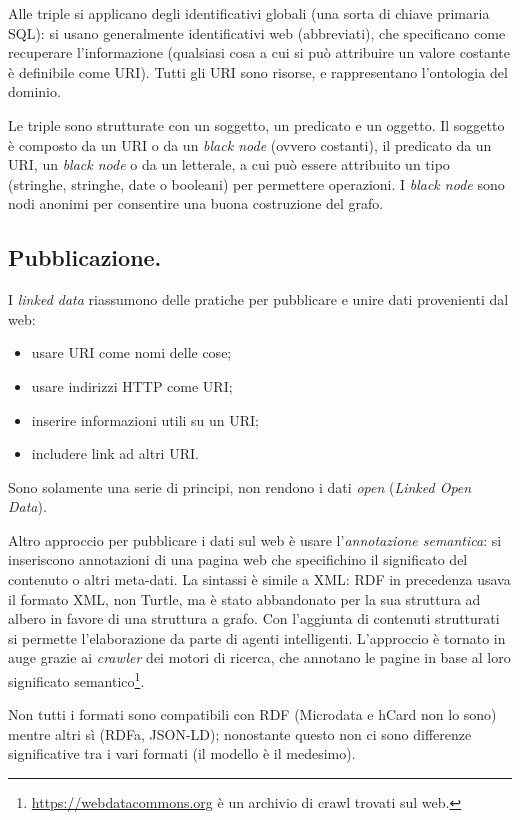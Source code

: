 \documentclass[11pt]{article}
\begin{document}
\begin{multicols}{2}
Alle triple si applicano degli identificativi globali (una sorta di chiave primaria SQL): si usano generalmente identificativi web (abbreviati), che specificano come recuperare l'informazione (qualsiasi cosa a cui si può attribuire un valore costante è definibile come URI).
Tutti gli URI sono risorse, e rappresentano l'ontologia del dominio.

Le triple sono strutturate con un soggetto, un predicato e un oggetto.
Il soggetto è composto da un URI o da un \textit{black node} (ovvero costanti), il predicato da un URI, un \textit{black node} o da un letterale, a cui può essere attribuito un tipo (stringhe, stringhe, date o booleani) per permettere operazioni.
I \textit{black node} sono nodi anonimi per consentire una buona costruzione del grafo.

\subsection{Pubblicazione.}
I \textit{linked data} riassumono delle pratiche per pubblicare e unire dati provenienti dal web:
\begin{itemize}
  \item usare URI come nomi delle cose;
  \item usare indirizzi HTTP come URI;
  \item inserire informazioni utili su un URI;
  \item includere link ad altri URI.
\end{itemize}
Sono solamente una serie di principi, non rendono i dati \textit{open} (\textit{Linked Open Data}). \newline

Altro approccio per pubblicare i dati sul web è usare l'\textit{annotazione semantica}: si inseriscono annotazioni di una pagina web che specifichino il significato del contenuto o altri meta-dati.
La sintassi è simile a XML: RDF in precedenza usava il formato XML, non Turtle, ma è stato abbandonato per la sua struttura ad albero in favore di una struttura a grafo.
Con l'aggiunta di contenuti strutturati si permette l'elaborazione da parte di agenti intelligenti.
L'approccio è tornato in auge grazie ai \textit{crawler} dei motori di ricerca, che annotano le pagine in base al loro significato semantico\footnote{\url{https://webdatacommons.org} è un archivio di crawl trovati sul web.}.

Non tutti i formati sono compatibili con RDF (Microdata e hCard non lo sono) mentre altri sì (RDFa, JSON-LD); nonostante questo non ci sono differenze significative tra i vari formati (il modello è il medesimo).


\end{multicols}
\end{document}
